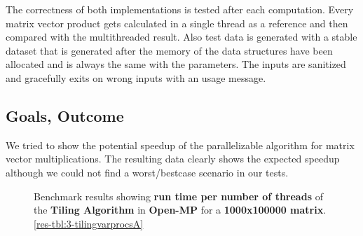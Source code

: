 The correctness of both implementations is tested after each computation.
Every matrix vector product gets calculated in a single thread as a reference and then compared with the multithreaded result.
Also test data is generated with a stable dataset that is generated after the memory of the data structures have been allocated and is always the same with the parameters.
The inputs are sanitized and gracefully exits on wrong inputs with an usage message.

\subsection{Goals, Outcome}

We tried to show the potential speedup of the parallelizable algorithm for matrix vector multiplications.
The resulting data clearly shows the expected speedup although we could not find a worst/bestcase scenario in our tests.


\begin{figure}[h!]
  \centering
  \caption{Benchmark results showing \textbf{run time per number of threads} of the \textbf{Tiling Algorithm} in \textbf{Open-MP} for a \textbf{1000x100000 matrix}. \autoref{res-tbl:3-tilingvarprocsA}}
  \label{plot:3-tilingvarprocsA}
\end{figure}


